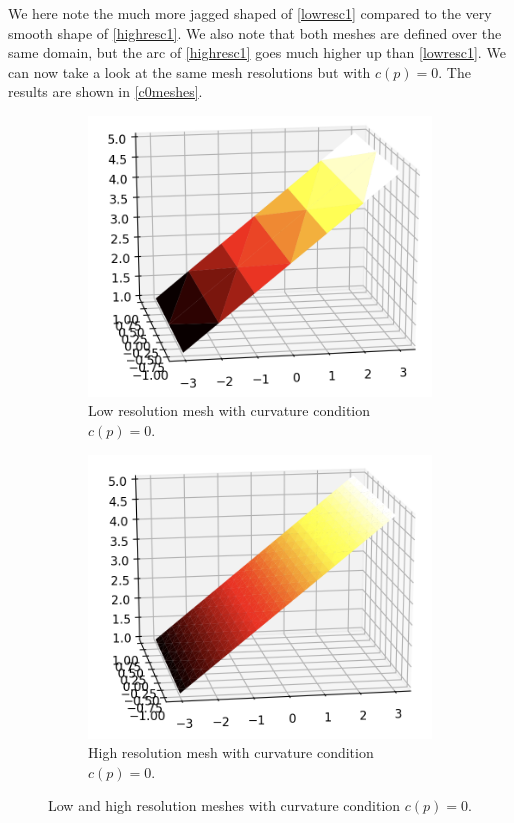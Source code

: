 We here note the much more jagged shaped of \autoref{lowresc1} compared to the very smooth shape of \autoref{highresc1}. We also note that both meshes are defined over the same domain, but the arc of \autoref{highresc1} goes much higher up than  \autoref{lowresc1}.  We can now take a look at the same mesh resolutions but with $c(p) = 0$. The results are shown in \autoref{c0meshes}.
\begin{figure}[H]
	\centering
	\begin{subfigure}[b]{0.49\linewidth}
		\centering
		\includegraphics[width=\linewidth]{Materials/lowresc0}
		\caption{Low resolution mesh with curvature condition $c(p) = 0$.}
		\label{lowresc0}
	\end{subfigure}
	\hfill
	\begin{subfigure}[b]{0.49\linewidth}
		\centering
		\includegraphics[width=\linewidth]{Materials/highresc0}
		\caption{High resolution mesh with curvature condition $c(p) = 0$.}
		\label{highresc0}
	\end{subfigure}
	\caption{Low and high resolution meshes with curvature condition $c(p) = 0$.}
	\label{c0meshes}
\end{figure}
